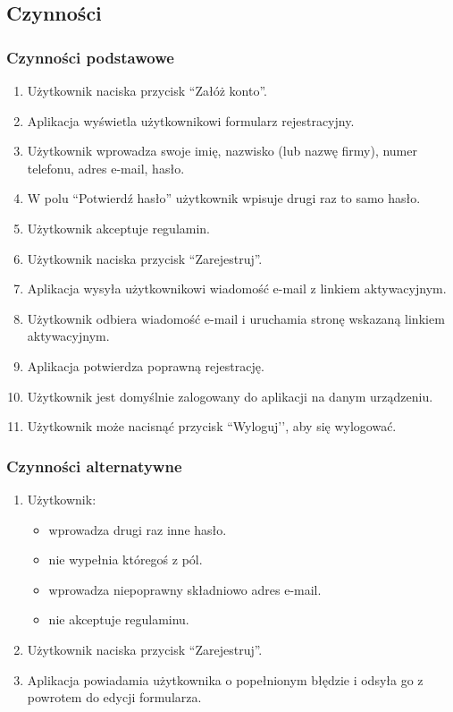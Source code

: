 \documentclass[12pt,a4paper,twoside]{article}
\begin{document}
    \subsection{Czynności}


    \subsubsection{Czynności podstawowe}


    \begin{enumerate}
        \item Użytkownik naciska przycisk ``Załóż konto''.
        \item Aplikacja wyświetla użytkownikowi formularz rejestracyjny.
        \item Użytkownik wprowadza swoje imię, nazwisko (lub nazwę firmy), numer telefonu, adres e-mail, hasło.
        \item W polu ``Potwierdź hasło'' użytkownik wpisuje drugi raz to samo hasło.
        \item Użytkownik akceptuje regulamin.
        \item Użytkownik naciska przycisk ``Zarejestruj''.
        \item Aplikacja wysyła użytkownikowi wiadomość e-mail z linkiem aktywacyjnym.
        \item Użytkownik odbiera wiadomość e-mail i uruchamia stronę wskazaną linkiem aktywacyjnym.
        \item Aplikacja potwierdza poprawną rejestrację.
     \item Użytkownik jest domyślnie zalogowany do aplikacji na danym urządzeniu.
     \item Użytkownik może nacisnąć przycisk ``Wyloguj’’, aby się wylogować.
    \end{enumerate}


    \subsubsection{Czynności alternatywne}


    \begin{enumerate}
        \item Użytkownik:
        \begin{itemize}
            \item wprowadza drugi raz inne hasło.
            \item nie wypełnia któregoś z pól.
            \item wprowadza niepoprawny składniowo adres e-mail.
            \item nie akceptuje regulaminu.
        \end{itemize}
        \item Użytkownik naciska przycisk ``Zarejestruj''.
        \item Aplikacja powiadamia użytkownika o popełnionym błędzie i odsyła go z powrotem do edycji formularza.
    \end{enumerate}
\end{document}
